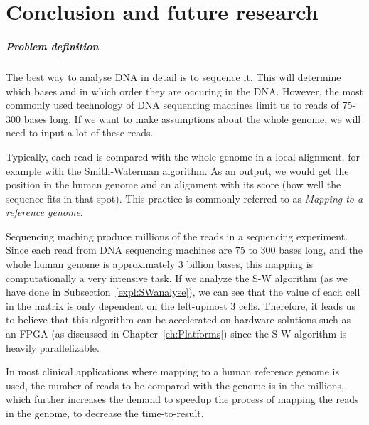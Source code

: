 
\chapter{Conclusion and future research}
\label{ch:Conclusions}

\paragraph{Problem definition} 

The best way to analyse DNA in detail is to sequence it. This will determine which bases and in which order they are occuring in the DNA. However, the most commonly used technology of DNA sequencing machines limit us to reads of 75-300 bases long. If we want to make assumptions about the whole genome, we will need to input a lot of these reads. 

Typically, each read is compared with the whole genome in a local alignment, for example with the Smith-Waterman algorithm. As an output, we would get the position in the human genome and an alignment with its score (how well the sequence fits in that spot). This practice is commonly referred to as \emph{Mapping to a reference genome}.

Sequencing maching produce millions of the reads in a sequencing experiment. Since each read from DNA sequencing machines are 75 to 300 bases long, and the whole human genome is approximately 3 billion bases, this mapping is computationally a very intensive task. If we analyze the S-W algorithm (as we have done in Subsection~\ref{expl:SWanalyse}), we can see that the value of each cell in the matrix is only dependent on the left-upmost 3 cells. Therefore, it leads us to believe that this algorithm can be accelerated on hardware solutions such as an FPGA (as discussed in Chapter~\ref{ch:Platforms}) since the S-W algorithm is heavily parallelizable.

In most clinical applications where mapping to a human reference genome is used, the number of reads to be compared with the genome is in the millions, which further increases the demand to speedup the process of mapping the reads in the genome, to decrease the time-to-result.

